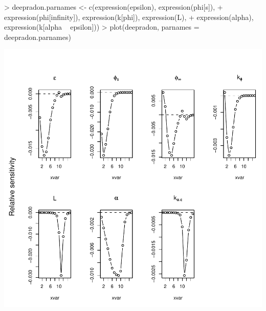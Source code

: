 \documentclass{scrartcl}
\begin{document}
\begin{Schunk}
\begin{Sinput}
> deepradon.parnames <- c(expression(epsilon), expression(phi[s]), 
+     expression(phi[infinity]), expression(k[phi]), expression(L), 
+     expression(alpha), expression(k[alpha ~ epsilon]))
> plot(deepradon, parnames = deepradon.parnames)
\end{Sinput}
\end{Schunk}
\includegraphics{figures/f-radon1}
\end{document}

